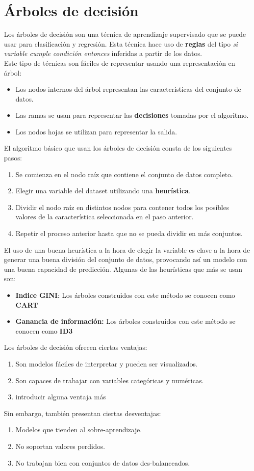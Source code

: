 \section{Árboles de decisión}
\label{alg:dec_tree}
Los árboles de decisión son una técnica de aprendizaje supervisado que se puede usar para clasificación y regresión. Esta técnica hace uso de \textbf{reglas} del tipo \textit{si variable cumple condición entonces } inferidas a partir de los datos. \\
Este tipo de técnicas son fáciles de representar usando una representación en árbol:
\begin{itemize}
	\item Los nodos internos del árbol representan las características del conjunto de datos.
	\item Las ramas se usan para representar las \textbf{decisiones} tomadas por el algoritmo.
	\item Los nodos hojas se utilizan para representar la salida.
\end{itemize}
El algoritmo básico que usan los árboles de decisión consta de los siguientes pasos:
\begin{enumerate}[1º]
	\item Se comienza en el nodo raíz que contiene el conjunto de datos completo.
	\item Elegir una variable del dataset utilizando una \textbf{heurística}.
	\item Dividir el nodo raíz en distintos nodos para contener todos los posibles valores de la característica seleccionada en el paso anterior.
	\item Repetir el proceso anterior hasta que no se pueda dividir en más conjuntos.
\end{enumerate}
El uso de una buena heurística a la hora de elegir la variable es clave a la hora de generar una buena división del conjunto de datos, provocando así un modelo con una buena capacidad de predicción. Algunas de las heurísticas que más se usan son:
\begin{itemize}
	\item \textbf{Indice GINI}: Los árboles construidos con este método se conocen como \textbf{CART}
	\item \textbf{Ganancia de información:} Los árboles construidos con este método se conocen como \textbf{ID3}
\end{itemize}
Los árboles de decisión ofrecen ciertas ventajas:
\begin{enumerate}
	\item Son modelos fáciles de interpretar y pueden ser visualizados.
	\item Son capaces de trabajar con variables categóricas y numéricas.
	\item introducir alguna ventaja más
\end{enumerate}
Sin embargo, también presentan ciertas desventajas:
\begin{enumerate}
	\item Modelos que tienden al sobre-aprendizaje.
	\item No soportan valores perdidos.
	\item No trabajan bien con conjuntos de datos des-balanceados.
\end{enumerate}
